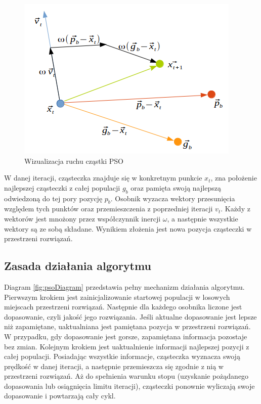 \begin{figure}[H]
\begin{center} 
\includegraphics[scale=0.8]{tresc/pics/psoRuch.png}
\caption{Wizualizacja ruchu cząstki PSO}
\label{fig:psoWizualizacja}
\end{center}
\end{figure}

W danej iteracji, cząsteczka znajduje się w konkretnym punkcie $x_t$, zna położenie najlepszej cząsteczki z całej populacji $g_b$ oraz pamięta swoją najlepszą odwiedzoną do tej pory pozycję $p_b$. Osobnik wyzacza wektory przesunięcia względem tych punktów oraz przemieszczenia z poprzedniej iteracji $v_t$. Każdy z wektorów jest mnożony przez współczynnik inercji $\omega$, a następnie wszystkie wektory są ze sobą składane. Wynikiem złożenia jest nowa pozycja cząsteczki w przestrzeni rozwiązań.

\subsection*{Zasada działania algorytmu}
\label{sec:psoDzialanie}
Diagram \ref{fig:psoDiagram} przedstawia pełny mechanizm działania algorytmu. Pierwszym krokiem jest zainicjalizowanie startowej populacji w losowych miejscach przestrzeni rozwiązań. Następnie dla każdego osobnika liczone jest dopasowanie, czyli jakość jego rozwiązania. Jeśli aktualne dopasowanie jest lepsze niż zapamiętane, uaktualniana jest pamiętana pozycja w przestrzeni rozwiązań. W przypadku, gdy dopasowanie jest gorsze, zapamiętana informacja pozostaje bez zmian. Kolejnym krokiem jest uaktualnienie informacji najlepszej pozycji z całej populacji. Posiadając wszystkie informacje, cząsteczka wyznacza swoją prędkość w danej iteracji, a następnie przemieszcza się zgodnie z nią w przestrzeni rozwiązań. Aż do spełnienia warunku stopu (uzyskanie pożądanego dopasowania lub osiągnięcia limitu iteracji), cząsteczki ponownie wyliczają swoje dopasowanie i powtarzają cały cykl.

